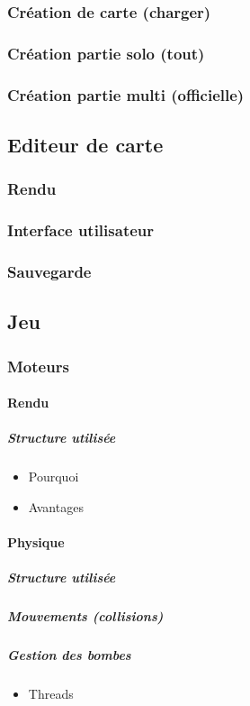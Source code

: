 \documentclass[]{report}
\begin{document}
			\subsubsection{Création de carte (charger)}
			\subsubsection{Création partie solo (tout)}
			\subsubsection{Création partie multi (officielle)}
			
		\subsection{Editeur de carte}
			\subsubsection{Rendu}
			\subsubsection{Interface utilisateur}
			\subsubsection{Sauvegarde}
		\subsection{Jeu}
			\subsubsection{Moteurs}
				\paragraph{Rendu}
					\subparagraph{Structure utilisée}
					\begin{itemize}
						\item{Pourquoi}
						\item{Avantages}
					\end{itemize}
				\paragraph{Physique}
					\subparagraph{Structure utilisée}
					\subparagraph{Mouvements (collisions)}
					\subparagraph{Gestion des bombes}
						\begin{itemize}
							\item{Threads}
						\end{itemize}
\end{document}
